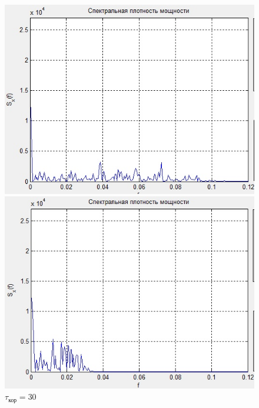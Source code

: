  \begin{figure}[H]
	\begin{minipage}{0.3\linewidth}
		\centering
		\includegraphics[width=\linewidth]{tasks/task1/realize10_sp}
		\caption*{$\tau_\text{кор}=10$}
	\end{minipage}
	\begin{minipage}{0.3\linewidth}
		\centering
		\includegraphics[width=\linewidth]{tasks/task1/realize30_sp}
		\caption*{$\tau_\text{кор}=30$}
	\end{minipage}
	\begin{minipage}{0.3\linewidth}
		\centering

\end{minipage}
\end{figure}
